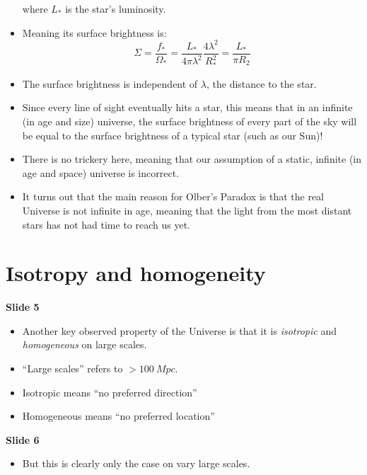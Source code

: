 \documentclass[11pt]{article}
\begin{document}
\begin{itemize}
  where $L_\ast$ is the star's luminosity.
  \item Meaning its surface brightness is:
  \begin{equation}
  \Sigma = \frac{f_\ast}{\Omega_\ast}=\frac{L_\ast}{4\pi \lambda^2}\frac{4\lambda^2}{R_\ast^2} = \frac{L_\ast}{\pi R_2}
  \end{equation}
  \item The surface brightness is independent of $\lambda$, the distance to the star.
  \item Since every line of sight eventually hits a star, this means that in an infinite (in age and size) universe, the surface brightness of every part of the sky will be equal to the surface brightness of a typical star (such as our Sun)!
  \item There is no trickery here, meaning that our assumption of a static, infinite (in age and space) universe is incorrect.
  \item It turns out that the main reason for Olber's Paradox is that the real Universe is not infinite in age, meaning that the light from the most distant stars has not had time to reach us yet.
\end{itemize}

\section{Isotropy and homogeneity}
{\bf Slide 5}
\begin{itemize}
\item Another key observed property of the Universe is that it is {\it isotropic} and {\it homogeneous} on large scales.
\item ``Large scales'' refers to $>100~Mpc$.
\item Isotropic means ``no preferred direction''
\item Homogeneous means ``no preferred location''
\end{itemize}

\vspace{3mm}
\noindent
{\bf Slide 6}
\begin{itemize}
\item But this is clearly only the case on vary large scales.
\end{itemize}
\end{document}
